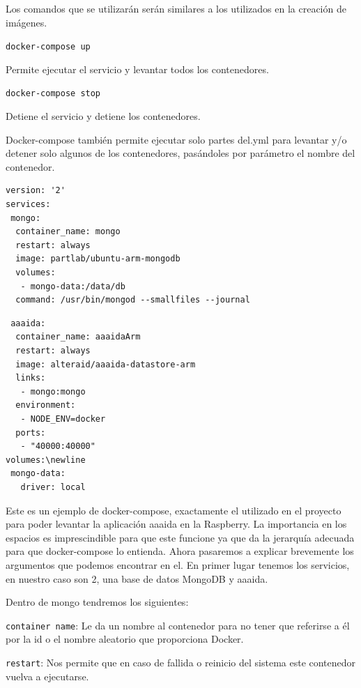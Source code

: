 Los comandos que se utilizarán serán similares a los utilizados en la creación de imágenes.

\begin{center}
\texttt{docker-compose up}
\end{center} 

Permite ejecutar el servicio y levantar todos los contenedores.

\begin{center}
\texttt{docker-compose stop}
\end{center} 

Detiene el servicio y detiene los contenedores. 

Docker-compose también permite ejecutar solo partes del.yml para levantar y/o detener solo algunos de los contenedores, pasándoles por parámetro el nombre del contenedor.

\begin{center}
\begin{verbatim}
version: '2'
services:
 mongo:
  container_name: mongo
  restart: always
  image: partlab/ubuntu-arm-mongodb
  volumes:
   - mongo-data:/data/db
  command: /usr/bin/mongod --smallfiles --journal
  \end{verbatim}
\begin{verbatim}
 aaaida:
  container_name: aaaidaArm
  restart: always
  image: alteraid/aaaida-datastore-arm
  links:
   - mongo:mongo 
  environment:
   - NODE_ENV=docker
  ports:
   - "40000:40000"
volumes:\newline
 mongo-data:
   driver: local
\end{verbatim}
\end{center}

Este es un ejemplo de docker-compose, exactamente el utilizado en el proyecto para poder levantar la aplicación aaaida en la Raspberry. 
La importancia en los espacios es imprescindible para que este funcione ya que da la jerarquía adecuada para que docker-compose lo entienda.
Ahora pasaremos a explicar brevemente los argumentos que podemos encontrar en el. 
En primer lugar tenemos los servicios, en nuestro caso son 2, una base de datos MongoDB y aaaida.

Dentro de mongo tendremos los siguientes: 

\texttt{container name}: Le da un nombre al contenedor para no tener que referirse a él por la id o el nombre aleatorio que proporciona Docker.

\texttt{restart}: Nos permite que en caso de fallida o reinicio del sistema este contenedor vuelva a ejecutarse.

